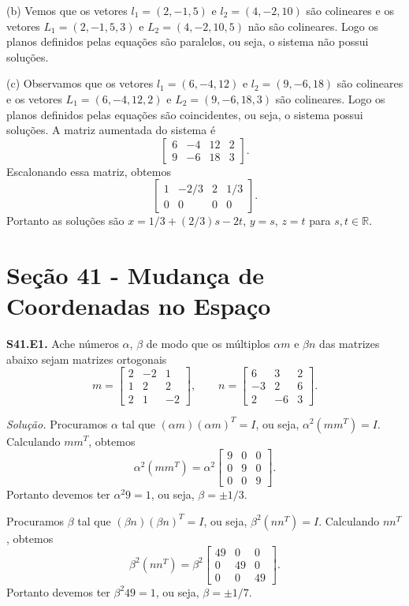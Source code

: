 \documentclass[a4paper,11pt]{article}
\newcommand{\R}{\mathbb{R}}
\begin{document}
(b)
Vemos que os vetores $l_1 = (2,-1,5)$ e $l_2 = (4,-2,10)$ são colineares e os vetores $L_1 = (2,-1,5,3)$ e $L_2 = (4,-2,10,5)$ não são colineares.
Logo os planos definidos pelas equações são paralelos, ou seja, o sistema não possui soluções.

(c)
Observamos que os vetores $l_1 = (6,-4,12)$ e $l_2 = (9,-6,18)$ são colineares e os vetores $L_1 = (6,-4,12,2)$ e $L_2 = (9,-6,18,3)$ são colineares.
Logo os planos definidos pelas equações são coincidentes, ou seja, o sistema possui soluções.
A matriz aumentada do sistema é
\[
  \begin{bmatrix}
    6 & -4 & 12 & 2 \\
    9 & -6 & 18 & 3
  \end{bmatrix}.
\]
Escalonando essa matriz, obtemos
\[
  \begin{bmatrix}
    1 & -2/3 & 2 & 1/3 \\
    0 & 0 & 0 & 0
  \end{bmatrix}.
\]
Portanto as soluções são $x = 1/3 + (2/3)s - 2t$, $y = s$, $z = t$ para $s, t \in \R$.

\section*{Seção 41 - Mudança de Coordenadas no Espaço}

\textbf{S41.E1.}
Ache números $\alpha$, $\beta$ de modo que os múltiplos $\alpha m$ e $\beta n$ das matrizes abaixo sejam matrizes ortogonais
\[
  m =
  \begin{bmatrix}
    2 & -2 & 1 \\
    1 & 2 & 2 \\
    2 & 1 & -2
  \end{bmatrix},
  \qquad n =
  \begin{bmatrix}
    6 & 3 & 2 \\
    -3 & 2 & 6 \\
    2 & -6 & 3
  \end{bmatrix}.
\]

\vspace{\baselineskip}

\emph{Solução.}
Procuramos $\alpha$ tal que $(\alpha m)(\alpha m)^T = I$, ou seja, $\alpha^2 (m m^T) = I$.
Calculando $mm^T$, obtemos
\[
  \alpha^2 (mm^T) = \alpha^2
  \begin{bmatrix}
    9 & 0 & 0 \\
    0 & 9 & 0 \\
    0 & 0 & 9
  \end{bmatrix}.
\]
Portanto devemos ter $\alpha^2 9 = 1$, ou seja, $\beta = \pm 1/3$.

Procuramos $\beta$ tal que $(\beta n)(\beta n)^T = I$, ou seja, $\beta^2 (n n^T) = I$.
Calculando $nn^T$, obtemos
\[
  \beta^2 (nn^T) = \beta^2
  \begin{bmatrix}
    49 & 0 & 0 \\
    0 & 49 & 0 \\
    0 & 0 & 49
  \end{bmatrix}.
\]
Portanto devemos ter $\beta^2 49 = 1$, ou seja, $\beta = \pm 1/7$.
\end{document}
